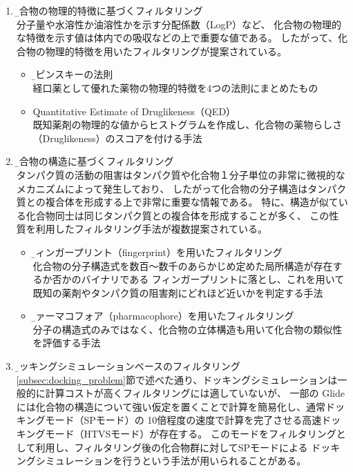 \begin{enumerate}
\item \b{化合物の物理的特徴に基づくフィルタリング}\\
	分子量や水溶性か油溶性かを示す分配係数（LogP）など、
	化合物の物理的な特徴を示す値は体内での吸収などの上で重要な値である。
	したがって、化合物の物理的特徴を用いたフィルタリングが提案されている。
	\begin{itemize}
	\item \b{リピンスキーの法則\cite{Lipinski1997}}\\
		経口薬として優れた薬物の物理的特徴を4つの法則にまとめたもの
	\item \b{Quantitative Estimate of Druglikeness（QED）\cite{Bickerton2012}}\\
		既知薬剤の物理的な値からヒストグラムを作成し、化合物の薬物らしさ（Druglikeness）のスコアを付ける手法
	\end{itemize}
\item \b{化合物の構造に基づくフィルタリング}\\
	タンパク質の活動の阻害はタンパク質や化合物１分子単位の非常に微視的なメカニズムによって発生しており、
	したがって化合物の分子構造はタンパク質との複合体を形成する上で非常に重要な情報である。
	特に、構造が似ている化合物同士は同じタンパク質との複合体を形成することが多く、
	この性質を利用したフィルタリング手法が複数提案されている。
	\begin{itemize}
	\item \b{フィンガープリント（fingerprint）を用いたフィルタリング\cite{Nilakantan1993}}\\
		化合物の分子構造式を数百～数千のあらかじめ定めた局所構造が存在するか否かのバイナリである
		フィンガープリントに落とし、これを用いて既知の薬剤やタンパク質の阻害剤にどれほど近いかを判定する手法
	\item \b{ファーマコフォア（pharmacophore）を用いたフィルタリング\cite{Parenti2003}}\\
		分子の構造式のみではなく、化合物の立体構造も用いて化合物の類似性を評価する手法
	\end{itemize}
\item \b{ドッキングシミュレーションベースのフィルタリング}\\
	\ref{subsec:docking_problem}節で述べた通り、ドッキングシミュレーションは一般的に計算コストが高くフィルタリングには適していないが、
	一部の
	Glideには化合物の構造について強い仮定を置くことで計算を簡易化し、通常ドッキングモード（SPモード）の
	10倍程度の速度\cite{GlideHomePage}で計算を完了させる高速ドッキングモード（HTVSモード）が存在する。
	このモードをフィルタリングとして利用し、フィルタリング後の化合物群に対してSPモードによる
	ドッキングシミュレーションを行うという手法が用いられることがある\cite{Fujimoto2008}。
\end{enumerate}


